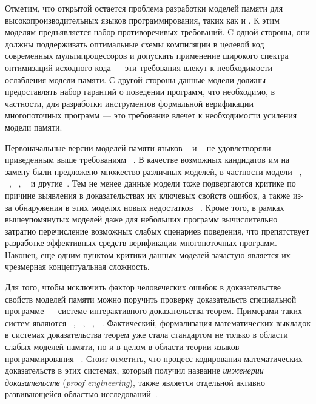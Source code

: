 Отметим, что открытой остается проблема разработки моделей памяти
для высокопроизводительных языков программирования, таких как \CPP и \Java.
К этим моделям предъявляется набор противоречивых требований.
C одной стороны, они должны поддерживать оптимальные схемы компиляции в
целевой код современных мультипроцессоров и допускать применение
широкого спектра оптимизаций исходного кода --- эти требования
влекут к необходимости ослабления модели памяти.
С другой стороны данные модели должны предоставлять набор
гарантий о поведении программ, что необходимо, в частности, для разработки инструментов
формальной верификации многопоточных программ --- это требование
влечет к необходимости усиления модели памяти.

Первоначальные версии моделей памяти языков
\CPP~\autocite{Batty-al:POPL11} и \Java~\autocite{Manson-al:POPL05}
не удовлетворяли приведенным выше требованиям%
~\autocite{Sevcik-Aspinall:ECOOP08,Vafeiadis-al:POPL15,Batty-al:ESOP15}. 
В качестве возможных кандидатов им на замену были предложено множество различных моделей,
в частности модели \Wkm~\autocite{Chakraborty-Vafeiadis:POPL19}, \Prm~\autocite{Kang-al:POPL17}, 
\MRD~\autocite{Paviotti-al:ESOP20}, \PwT~\autocite{Jagadeesan-al:OOPSLA2020,Jeffrey-al:POPL2022}
и другие~\autocite{Jeffrey-Riely:LICS16, PichonPharabod-Sewell:POPL16, Paviotti-al:ESOP20}.
Тем не менее данные модели тоже подвергаются критике по причине
выявления в доказательствах их ключевых свойств ошибок,
а также из-за обнаружения в этих моделях новых недостатков%
~\autocite{Paviotti-al:ESOP20,Jagadeesan-al:OOPSLA2020,Lee-al:PLDI20,Cho-al:PLDI21}.
Кроме того, в рамках вышеупомянутых моделей даже для небольших программ
вычислительно затратно перечисление возможных слабых сценариев поведения,
что препятствует разработке эффективных средств верификации многопоточных программ.
Наконец, еще одним пунктом критики данных моделей
зачастую является их чрезмерная концептуальная сложность.

Для того, чтобы исключить фактор человеческих ошибок
в доказательстве свойств моделей памяти можно поручить
проверку доказательств специальной программе ---
системе интерактивного доказательства теорем.
Примерами таких систем являются \coq~\autocite{Coq},
\agda~\autocite{Agda}, \lean~\autocite{Lean}, \arend~\autocite{Arend}.
Фактический, формализация математических выкладок
в системах доказательства теорем уже стала стандартом
не только в области слабых моделей памяти,
но и в целом в области теории языков программирования%
~\autocite{Ringer-al:FTPL19}.
Стоит отметить, что процесс кодирования математических доказательств
в этих системах, который получил название \emph{инженерии доказательств}
(\emph{proof engineering}), также является отдельной
активно развивающейся областью исследований~\autocite{Ringer-al:FTPL19}.

